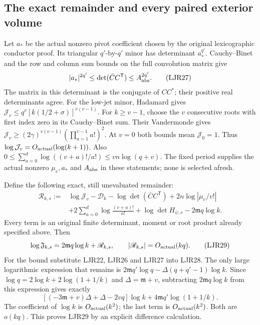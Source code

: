 \documentclass[11pt,a4paper]{article}
\begin{document}
\subsection{The exact remainder and every paired exterior volume}

Let $a_*$ be the actual nonzero pivot coefficient chosen by
the original lexicographic conductor proof. Its triangular
$q'$-by-$q'$ minor has determinant $a_*^{q'}$.
Cauchy--Binet and the row and column sum bounds on the full
convolution matrix give
\[
 |a_*|^{2q'}\le\det(\bar C C^{\mathsf T})
                              \le A_{\rm abs}^{2q'}.
 \tag{LJR27}
\]
The matrix in this determinant is the conjugate of $CC^*$;
their positive real determinants agree.
For the low-jet minor, Hadamard gives
$\mathcal J_v\le q^v[k(1/2+\sigma)]^{v(v-1)}$.
For $k\ge v-1$, choose the $v$ consecutive roots with first
index zero in its Cauchy--Binet sum. Their Vandermonde gives
$\mathcal J_v\ge(2\gamma)^{v(v-1)}
(\prod_{a=1}^{v-1}a!)^2$.
At $v=0$ both bounds mean $\mathcal J_0=1$.
Thus $\log\mathcal J_v=O_{\rm actual}(\log(k+1))$.
Also
$0\le\sum_{a=0}^d\log((v+a)!/a!)
\le vn\log(q+v)$.
The fixed period supplies the actual nonzero $\mu_v,a_*$
and $A_{\rm abs}$ in these statements; none is selected afresh.

Define the following exact, still unevaluated remainder:
\[
 \begin{split}
 \mathscr R_{k,s}:={}&
 \log\mathcal J_v-\mathscr D_k
 -\log\det(\bar C C^{\mathsf T})
 +2n\log|\mu_v/v!|\\
 &+2\sum_{a=0}^d\log\frac{(v+a)!}{a!}
 +\log\det H_{\psi,s}-2\mathfrak m q\log k .
 \end{split}\tag{LJR28}
\]
Every term is an original finite determinant, moment or root
product already specified above. Then
\[
 \log\mathfrak J_{k,s}
       =2\mathfrak m q\log k+\mathscr R_{k,s},\qquad
 |\mathscr R_{k,s}|=O_{\rm actual}(kq).
 \tag{LJR29}
\]
For the bound substitute LJR22, LJR26 and LJR27 into LJR28.
The only large logarithmic expression that remains is
$2\mathfrak m q'\log q-\Delta(q+q'-1)\log k$.
Since $\log q=2\log k+2\log(1+1/k)$ and
$\Delta=\mathfrak m+v$, subtracting $2\mathfrak m q\log k$
from this expression gives exactly
\[
 [(-3\mathfrak m+v)\Delta+\Delta-2vq]\log k
          +4\mathfrak m q'\log(1+1/k).
 \tag{LJR30}
\]
The coefficient of $\log k$ is $O_{\rm actual}(k^2)$;
the last term is $O_{\rm actual}(k^2)$.
Both are $o(kq)$. This proves LJR29 by an explicit
difference calculation.
\end{document}
